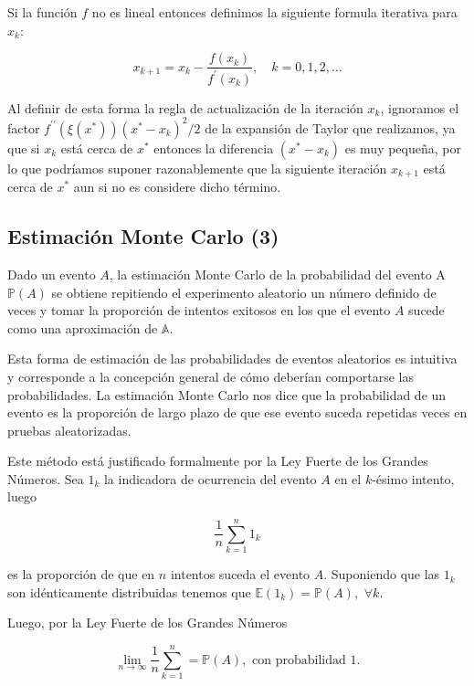 \documentclass[9pt,twocolumn,twoside,]{pnas-new}
\begin{document}
Si la función \(f\) no es lineal entonces definimos la siguiente formula
iterativa para \(x_k\):

\[
x_{k+1}=x_{k}-\frac{f\left(x_{k}\right)}{f^{\prime}\left(x_{k}\right)}, \quad k=0,1,2, \ldots
\]

Al definir de esta forma la regla de actualización de la iteración
\(x_k\), ignoramos el factor
\(f^{\prime \prime}\left(\xi\left(x^{*}\right)\right)\left(x^{*}-x_{k}\right)^{2} / 2\)
de la expansión de Taylor que realizamos, ya que si \(x_k\) está cerca
de \(x^*\) entonces la diferencia \(\left(x^{*}-x_{k}\right)\) es muy
pequeña, por lo que podríamos suponer razonablemente que la siguiente
iteración \(x_{k+1}\) está cerca de \(x^*\) aun si no es considere dicho
término.

\hypertarget{estimaciuxf3n-monte-carlo-dobrow2016introduction}{%
\subsection{Estimación Monte Carlo
(3)}\label{estimaciuxf3n-monte-carlo-dobrow2016introduction}}

Dado un evento \(A\), la estimación Monte Carlo de la probabilidad del
evento A \(\mathbb{P}(A)\) se obtiene repitiendo el experimento
aleatorio un número definido de veces y tomar la proporción de intentos
exitosos en los que el evento \(A\) sucede como una aproximación de
\(\mathbb{A}\).

Esta forma de estimación de las probabilidades de eventos aleatorios es
intuitiva y corresponde a la concepción general de cómo deberían
comportarse las probabilidades. La estimación Monte Carlo nos dice que
la probabilidad de un evento es la proporción de largo plazo de que ese
evento suceda repetidas veces en pruebas aleatorizadas.

Este método está justificado formalmente por la Ley Fuerte de los
Grandes Números. Sea \(1_k\) la indicadora de ocurrencia del evento
\(A\) en el \(k\)-ésimo intento, luego

\[\frac{1}{n}\sum_{k=1}^n 1_k\]

es la proporción de que en \(n\) intentos suceda el evento \(A\).
Suponiendo que las \(1_k\) son idénticamente distribuidas tenemos que
\(\mathbb{E}(1_k)=\mathbb{P}(A), \,\, \forall k\).

Luego, por la Ley Fuerte de los Grandes Números

\[\lim_{n\to\infty} \frac{1}{n}\sum_{k=1}^n = \mathbb{P}(A), \text{ con probabilidad 1.}\]
\end{document}
